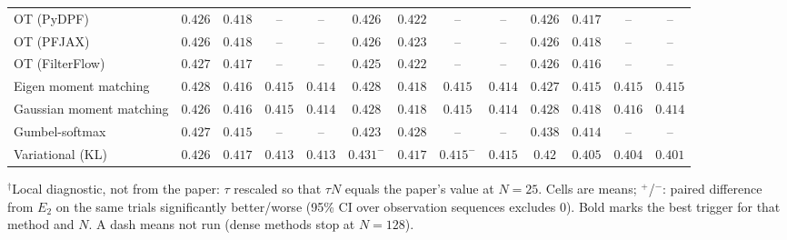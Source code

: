 \begin{table}[ht]
\begin{adjustbox}{max width=\linewidth}
\begin{tabular}{lcccc|cccc|cccc}
OT (PyDPF) & $0.426$ & $0.418$ & -- & -- & $0.426$ & $0.422$ & -- & -- & $\mathbf{0.426}$ & $\mathbf{0.417}$ & -- & -- \\
OT (PFJAX) & $\mathbf{0.426}$ & $0.418$ & -- & -- & $0.426$ & $0.423$ & -- & -- & $0.426$ & $\mathbf{0.418}$ & -- & -- \\
OT (FilterFlow) & $0.427$ & $0.417$ & -- & -- & $\mathbf{0.425}$ & $0.422$ & -- & -- & $0.426$ & $\mathbf{0.416}$ & -- & -- \\
Eigen moment matching & $0.428$ & $0.416$ & $\mathbf{0.415}$ & $\mathbf{0.414}$ & $0.428$ & $0.418$ & $0.415$ & $0.414$ & $\mathbf{0.427}$ & $\mathbf{0.415}$ & $0.415$ & $0.415$ \\
Gaussian moment matching & $\mathbf{0.426}$ & $\mathbf{0.416}$ & $\mathbf{0.415}$ & $\mathbf{0.414}$ & $0.428$ & $0.418$ & $0.415$ & $0.414$ & $0.428$ & $0.418$ & $0.416$ & $0.414$ \\
Gumbel-softmax & $0.427$ & $0.415$ & -- & -- & $\mathbf{0.423}$ & $0.428$ & -- & -- & $0.438$ & $\mathbf{0.414}$ & -- & -- \\
Variational (KL) & $0.426$ & $0.417$ & $0.413$ & $0.413$ & $0.431^{-}$ & $0.417$ & $0.415^{-}$ & $0.415$ & $\mathbf{0.42}$ & $\mathbf{0.405}$ & $\mathbf{0.404}$ & $\mathbf{0.401}$ \\
\bottomrule
\end{tabular}
\end{adjustbox}
\par\smallskip\parbox{0.95\linewidth}{\footnotesize $^\dagger$Local diagnostic, not from the paper: $\tau$ rescaled so that $\tau N$ equals the paper's value at $N{=}25$. Cells are means; $^{+}$/$^{-}$: paired difference from $E_2$ on the same trials significantly better/worse (95\% CI over observation sequences excludes 0). Bold marks the best trigger for that method and $N$. A dash means not run (dense methods stop at $N{=}128$).}
\end{table}

